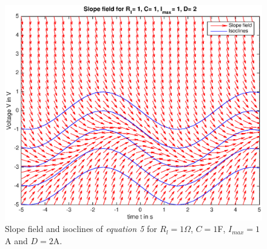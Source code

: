 \documentclass[
a4paper, 
12pt, 
]{article}
\begin{document}
\begin{figure}[h]
	\centering
	\includegraphics[width=0.85\linewidth]{Plots/lif_4}
	\caption{Slope field and isoclines of \textit{equation 5} for  $R_l = 1 \Omega$, $C=1$F, $I_{max}=1$A and $D=2$A.}
	\label{fig:lif_4}
\end{figure}
\end{document}
